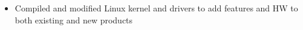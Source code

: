 \documentclass[letterpaper,11pt]{article}
\makeatletter
\newcommand{\resitem}[1]{\item #1 \vspace{-2pt}}
\newcommand{\ressubheading}[4]{
\begin{tabular*}{6.5in}{l@{\extracolsep{\fill}}r}
		\textbf{#1} & #2 \\
		\textit{#3} & \textit{#4} \\
\end{tabular*}\vspace{-6pt}}
\makeatother
\begin{document}
\begin{itemize}
{\begin{itemize}
					\resitem{Compiled and modified Linux kernel and drivers to add features and HW to both existing and new products}
				\end{itemize}
				}
\begin{comment}
		\item
			\ressubheading{\href{http://www.byui.edu}{Brigham Young University - Idaho}}{Rexburg, ID}{Student Computer Lab Administrator - Lead Tech}{May 2008 -- Apr. 2009}
				{ \footnotesize
				\begin{itemize}
					\resitem{Trained, coordinated, and guided a small team of students towards the completion of tasks involving all computer labs on campus}
					\resitem{Administrated 62 labs, 1,300+ computers, and 17 PXE Servers in a two domain environment;  Utilized \href{http://www.symantec.com/business/deployment-solution}{Altiris Deployment Console} and scripting;  Specialized in \href{http://www.redhat.com/rhel/}{RHE Linux} deployments}
					\resitem{Wrote concise installation and deployment instruction manuals and \href{http://www.derekhildreth.com/portfolio/Documentation/Lab_Binder_Documentation_BYUI_Work.pdf}{documentation} for computer labs and 200+ software titles}
				\end{itemize}
          			}
		\item 
			\ressubheading{Catch 80 Sports}{Rexburg, ID}{Network and Website Administrator}{Nov. 2006 -- Jun. 2007}
				{ \footnotesize
				\begin{itemize}
					\resitem{Implemented Windows based server with Linux based POS clients, reducing total cost of ownership}
					\resitem{Contributed essentially to the company in the production of an e-commerce website with company inventory}
					\resitem{Learned production of an entire e-commerce store in 1.5 months time with more than 2,800 products}
				\end{itemize}
				}
\end{comment}

	\end{itemize}  %
\end{document}
